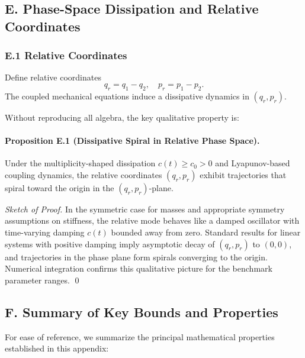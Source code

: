 \documentclass[11pt]{article}
\begin{document}
\subsection*{E. Phase-Space Dissipation and Relative Coordinates}

\subsubsection*{E.1 Relative Coordinates}

Define relative coordinates
\[
  q_r = q_1 - q_2, \quad p_r = p_1 - p_2.
\]
The coupled mechanical equations induce a dissipative dynamics in $(q_r,p_r)$.

Without reproducing all algebra, the key qualitative property is:

\paragraph{Proposition E.1 (Dissipative Spiral in Relative Phase Space).}
Under the multiplicity-shaped dissipation $c(t)\ge c_0>0$ and Lyapunov-based coupling dynamics, the relative coordinates $(q_r,p_r)$ exhibit trajectories that spiral toward the origin in the $(q_r,p_r)$-plane.

\emph{Sketch of Proof.} In the symmetric case for masses and appropriate symmetry assumptions on stiffness, the relative mode behaves like a damped oscillator with time-varying damping $c(t)$ bounded away from zero. Standard results for linear systems with positive damping imply asymptotic decay of $(q_r,p_r)$ to $(0,0)$, and trajectories in the phase plane form spirals converging to the origin. Numerical integration confirms this qualitative picture for the benchmark parameter ranges. \qed

\subsection*{F. Summary of Key Bounds and Properties}

For ease of reference, we summarize the principal mathematical properties established in this appendix:
\end{document}
